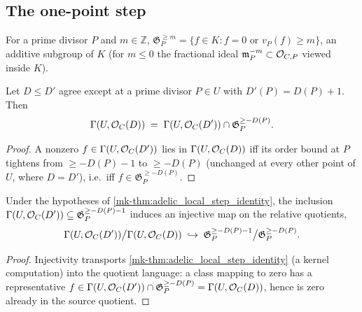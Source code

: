 \subsection{The one-point step}

\begin{definition}
  \label{mk-def:adelic_orderGe}
  \leanok
  For a prime divisor \(P\) and \(m \in \mathbb{Z}\),
  \(\mathfrak G_P^{\ge m} = \{ f \in K : f = 0 \text{ or } v_P(f) \ge m
  \}\), an additive subgroup of \(K\) (for \(m \le 0\) the fractional
  ideal \(\mathfrak m_P^{-m} \subset \mathcal{O}_{C,P}\) viewed inside \(K\)).
\end{definition}

\begin{theorem}
  \label{mk-thm:adelic_local_step_identity}
  \leanok
  Let \(D \le D'\) agree except at a prime divisor \(P \in U\) with
  \(D'(P) = D(P) + 1\). Then
  \[
    \Gamma(U, \mathcal{O}_{C}(D)) \;=\; \Gamma(U, \mathcal{O}_{C}(D')) \cap
      \mathfrak G_P^{\ge -D(P)}.
  \]
\end{theorem}
\begin{proof}
  \leanok
  A nonzero \(f \in \Gamma(U, \mathcal{O}_{C}(D'))\) lies in \(\Gamma(U,
  \mathcal{O}_{C}(D))\) iff its order bound at \(P\) tightens from \(\ge
  -D(P)-1\) to \(\ge -D(P)\) (unchanged at every other point of \(U\),
  where \(D = D'\)), i.e.\ iff \(f \in \mathfrak G_P^{\ge -D(P)}\).
\end{proof}

\begin{theorem}
  \label{mk-thm:adelic_local_step_injective}
  \leanok
  Under the hypotheses of \ref{mk-thm:adelic_local_step_identity}, the
  inclusion \(\Gamma(U, \mathcal{O}_{C}(D')) \subseteq \mathfrak G_P^{\ge
  -D(P)-1}\) induces an injective map on the relative quotients,
  \[
    \Gamma(U, \mathcal{O}_{C}(D')) \big/ \Gamma(U, \mathcal{O}_{C}(D))
      \;\hookrightarrow\;
      \mathfrak G_P^{\ge -D(P)-1} \big/ \mathfrak G_P^{\ge -D(P)}.
  \]
\end{theorem}
\begin{proof}
  \leanok
  Injectivity transports \ref{mk-thm:adelic_local_step_identity} (a
  kernel computation) into the quotient language: a class mapping to
  zero has a representative \(f \in \Gamma(U, \mathcal{O}_{C}(D')) \cap
  \mathfrak G_P^{\ge -D(P)} = \Gamma(U, \mathcal{O}_{C}(D))\), hence is zero
  already in the source quotient.
\end{proof}

